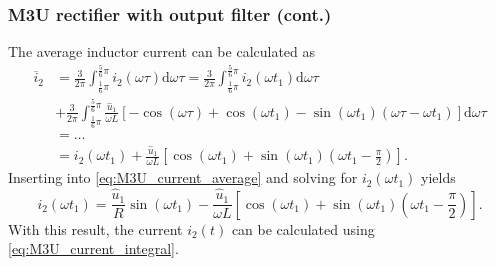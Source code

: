 \begin{frame}
    \frametitle{M3U rectifier with output filter (cont.)}
    The average inductor current can be calculated as
    \begin{equation}
        \begin{split}
            \overline{i}_2 &= \frac{3}{2\pi} \int_{\frac{1}{6}\pi}^{\frac{5}{6}\pi} i_2(\omega \tau) \mathrm{d} \omega \tau = \frac{3}{2\pi} \int_{\frac{1}{6}\pi}^{\frac{5}{6}\pi} i_2(\omega t_1) \mathrm{d} \omega \tau \\ &+ \frac{3}{2\pi} \int_{\frac{1}{6}\pi}^{\frac{5}{6}\pi} \frac{\hat{u}_1}{\omega L} \left[-\cos(\omega \tau) + \cos(\omega t_1) -\sin(\omega t_1)\left(\omega \tau - \omega t_1\right)\right] \mathrm{d} \omega \tau\\
            &=\ldots \\
            & = i_2(\omega t_1) + \frac{\hat{u}_1}{\omega L}\left[\cos(\omega t_1) + \sin(\omega t_1)(\omega t_1 - \frac{\pi}{2})\right].
        \end{split}
    \end{equation}
    Inserting into \eqref{eq:M3U_current_average} and solving for $i_2(\omega t_1)$ yields
    \begin{equation}
        i_2(\omega t_1) = \frac{\hat{u}_1}{R}\sin(\omega t_1) - \frac{\hat{u}_1}{\omega L}\left[\cos(\omega t_1) + \sin(\omega t_1)(\omega t_1 - \frac{\pi}{2})\right].
    \end{equation}
    With this result, the current $i_2(t)$ can be calculated using \eqref{eq:M3U_current_integral}.
\end{frame}

